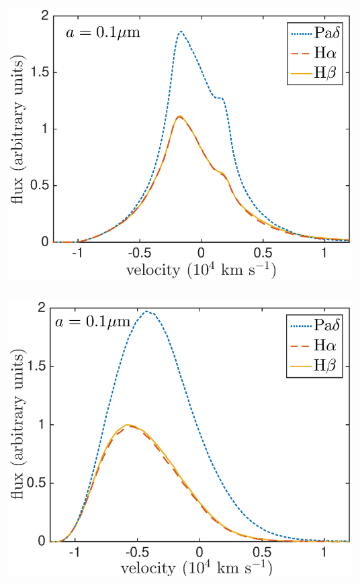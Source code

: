 \begin{figure}
\begin{subfigure}{0.5\textwidth}

\includegraphics[trim =10 29 25 0,clip=true,scale=0.42]{chapters/chapter4/images/dustdep/a0_1_opt_thin_HaHbPad}
\end{subfigure}
\hspace{3mm}
\begin{subfigure}{0.5\textwidth}
\includegraphics[trim =38 27 45 0,clip=true,scale=0.42]{chapters/chapter4/images/dustdep/a0_1_opt_thick_HaHbPad}
\end{subfigure} \\[2ex]


\end{figure}
